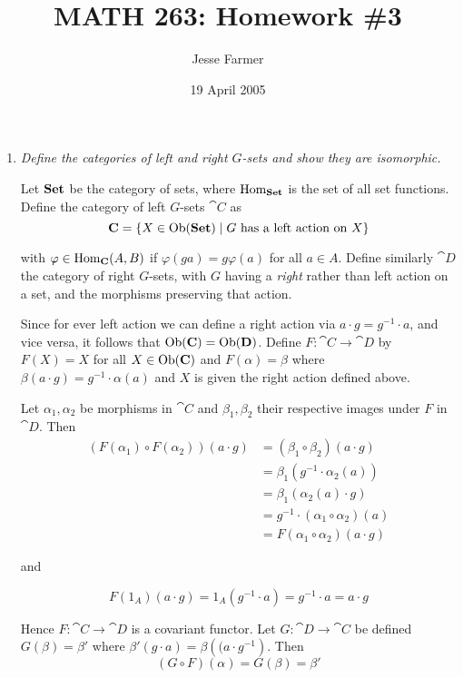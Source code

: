 \documentclass[10pt]{article}
\title{MATH 263: Homework \#3}
\author{Jesse Farmer}
\date{19 April 2005}
\begin{document}
\maketitle

\begin{enumerate}
\item \emph{Define the categories of left and right $G$-sets and show they are isomorphic.}

Let $\mathbf{Set}$ be the category of sets, where $\operatorname{Hom}_{\mathbf{Set}}$ is the set of all set functions.  Define the category of left $G$-sets $\cat{C}$ as $$\mathbf{C} = \left\{ X \in \operatorname{Ob}(\mathbf{Set}) \mid G \mbox{ has a left action on } X \right\}$$

with $\varphi \in \operatorname{Hom}_{\mathbf{C}}(A,B)$ if $\varphi(ga) = g\varphi(a)$ for all $a \in A$.  Define similarly $\cat{D}$ the category of right $G$-sets, with $G$ having a \emph{right} rather than left action on a set, and the morphisms preserving that action.

Since for ever left action we can define a right action via $a \cdot g = g^{-1} \cdot a$, and vice versa, it follows that $\operatorname{Ob}(\mathbf{C}) = \operatorname{Ob}(\mathbf{D})$.  Define $F: \cat{C} \rightarrow \cat{D}$ by $F(X) = X$ for all $X \in \operatorname{Ob}(\mathbf{C})$ and $F(\alpha) = \beta$ where $\beta(a \cdot g) = g^{-1} \cdot \alpha(a)$ and $X$ is given the right action defined above.

Let $\alpha_1, \alpha_2$ be morphisms in $\cat{C}$ and $\beta_1, \beta_2$ their respective images under $F$ in $\cat{D}$.  Then 
\begin{align*}
\left(F(\alpha_1) \circ F(\alpha_2)\right)(a \cdot g) 	&= 	(\beta_1 \circ \beta_2)(a \cdot g) \\
							&=	\beta_1\left(g^{-1} \cdot \alpha_2(a)\right) \\
							&=	\beta_1(\alpha_2(a) \cdot g) \\
							&=	g^{-1} \cdot (\alpha_1 \circ \alpha_2)(a) \\
							&=	F(\alpha_1 \circ \alpha_2)(a \cdot g)
\end{align*}

and

\[
F\left(1_A\right)(a \cdot g) = 1_A\left(g^{-1} \cdot a\right) = g^{-1} \cdot a = a \cdot g
\]

Hence $F: \cat{C} \rightarrow \cat{D}$ is a covariant functor.  Let $G: \cat{D} \rightarrow \cat{C}$ be defined $G(\beta) = \beta'$ where $\beta'(g \cdot a) = \beta\left((a \cdot g^{-1}\right)$.  Then 
\[
(G \circ F)(\alpha) = G(\beta) = \beta'
\]


\end{enumerate}
\end{document}
